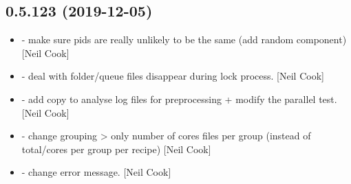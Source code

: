 \documentclass[a4paper,10pt,english]{report}
\begin{document}
\subsection{0.5.123 (2019-12-05)}
\label{\detokenize{misc/changelog:id20}}\begin{itemize}
\item {} 
 - make sure pids are really unlikely to be the
same (add random component) {[}Neil Cook{]}

\item {} 
 - deal with folder/queue files disappear during lock
process. {[}Neil Cook{]}

\item {} 
 - add copy to analyse log files for preprocessing +
modify the parallel test. {[}Neil Cook{]}

\item {} 
 - change grouping \textendash{}\textgreater{} only number
of cores files per group (instead of total/cores per group  per
recipe) {[}Neil Cook{]}

\item {} 
 - change error message. {[}Neil
Cook{]}

\end{itemize}
\end{document}
